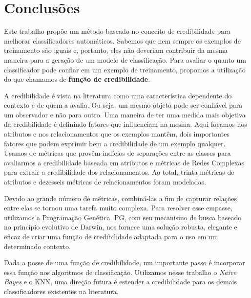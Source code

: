 \chapter{Conclusões}
\label{cap::conclusoes}


Este trabalho propõe um método baseado no conceito de credibilidade para melhorar classificadores automáticos.
Sabemos que nem sempre os exemplos de treinamento são iguais e, portanto, eles não deveriam contribuir da mesma maneira para a geração de um modelo de classificação.
Para avaliar o quanto um classificador pode confiar em um exemplo de treinamento, propomos a utilização do que chamamos de \textbf{função de credibilidade}.

A credibilidade é vista na literatura como uma característica dependente do contexto e de quem a avalia. Ou seja, um mesmo objeto pode ser confiável para um observador e não para outro.
Uma maneira de ter uma medida mais objetiva da credibilidade é definindo fatores que influenciam na mesma.
Aqui focamos nos atributos e nos relacionamentos que os exemplos mantêm, dois importantes fatores que podem exprimir bem a credibilidade de um exemplo qualquer.
Usamos de métricas que provêm indícios de separações entre as classes para avaliarmos a credibilidade baseada em atributos e métricas de Redes Complexas para extrair a credibilidade dos relacionamentos. Ao total, trinta métricas de atributos e dezesseis métricas de relacionamentos foram modeladas.

Devido ao grande número de métricas, combiná-las a fim de capturar relações entre elas se tornou uma tarefa muito complexa.
Para resolver esse empasse, utilizamos a Programação Genética. \textsc{PG}, com seu mecanismo de busca baseado no princípio evolutivo de Darwin, nos fornece uma solução robusta, elegante e eficaz de criar uma função de credibilidade adaptada para o uso em um determinado contexto.

Dada a posse de uma função de credibilidade, um importante passo é incorporar essa função nos algoritmos de classificação. Utilizamos nesse trabalho o \textit{Naïve Bayes} e o \textsc{KNN}, uma direção futura é estender a credibilidade para os demais classificadores existentes na literatura.

